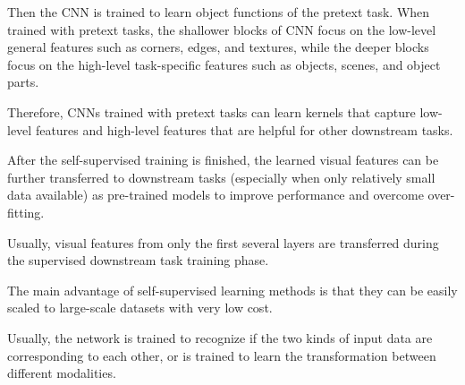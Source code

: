 Then the CNN is trained to learn object functions of the pretext task. When trained
with pretext tasks, the shallower blocks of CNN focus on the low-level general
features such as corners, edges, and textures, while the deeper blocks focus on
the high-level task-specific features such as objects, scenes, and object parts.

Therefore, CNNs trained with pretext tasks can learn kernels that capture low-level
features and high-level features that are helpful for other downstream tasks.

After the self-supervised training is finished, the learned visual features can
be further transferred to downstream tasks (especially when only relatively small
data available) as pre-trained models to improve performance and overcome over-fitting.

Usually, visual features from only the first several layers are transferred during
the supervised downstream task training phase.

The main advantage of self-supervised learning methods is that they can be easily
scaled to large-scale datasets with very low cost.

Usually, the network is trained to recognize if the two kinds of input data are
corresponding to each other, or is trained to learn the transformation between
different modalities.

